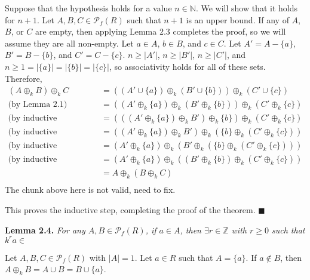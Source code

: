 \documentclass{article}
\newcommand{\abs}[1]{\left|#1\right|}
\newcommand{\zee}{\mathbb{Z}}
\newcommand{\N}{\mathbb{N}}
\begin{document}
Suppose that the hypothesis holds for a value $n \in \N$.
We will show that it holds for $n + 1$.
Let $A, B, C \in \mathcal{P}_f(R)$ such that $n + 1$
is an upper bound.
If any of $A$, $B$, or $C$ are empty, then applying
Lemma 2.3 completes the proof, so we will assume they are
all non-empty. Let $a \in A$, $b \in B$, and $c \in C$.
Let $A' = A - \{a\}$, $B' = B - \{b\}$, and $C' = C - \{c\}$.
$n \geq \abs{A'}$, $n \geq \abs{B'}$, $n \geq \abs{C'}$,
and $n \geq 1 = \abs{\{a\}} = \abs{\{b\}} = \abs{\{c\}}$,
so associativity holds for all of these sets. Therefore,
\[\begin{split}
    (A \oplus_k B) \oplus_k C
    &= ((A' \cup \{a\}) \oplus_k (B' \cup \{b\}))
        \oplus_k (C' \cup \{c\}) \\
    \text{(by Lemma 2.1)}\quad
    &= ((A' \oplus_k \{a\}) \oplus_k (B' \oplus_k \{b\}))
        \oplus_k (C' \oplus_k \{c\}) \\
    \text{(by inductive hypothesis)}\quad
    &= (((A' \oplus_k \{a\}) \oplus_k B') \oplus_k \{b\})
        \oplus_k (C' \oplus_k \{c\}) \\
    \text{(by inductive hypothesis)}\quad
    &= ((A' \oplus_k \{a\}) \oplus_k B') \oplus_k
        (\{b\} \oplus_k (C' \oplus_k \{c\})) \\
    \text{(by inductive hypothesis)}\quad
    &= (A' \oplus_k \{a\}) \oplus_k (B' \oplus_k
        (\{b\} \oplus_k (C' \oplus_k \{c\}))) \\
    \text{(by inductive hypothesis)}\quad
    &= (A' \oplus_k \{a\}) \oplus_k ((B' \oplus_k
        \{b\}) \oplus_k (C' \oplus_k \{c\})) \\
    &= A \oplus_k (B \oplus_k C) \\
\end{split}\]
The chunk above here is not valid, need to fix.

This proves the inductive step, completing the proof of
the theorem.
$\blacksquare$

\textbf{Lemma 2.4.} \textit{
    For any $A, B \in \mathcal{P}_f(R)$,
    if $a \in A$, then $\exists r \in \zee$
    with $r \geq 0$ such that $k^ra \in $
}

Let $A, B, C \in \mathcal{P}_f(R)$ with $\abs{A} = 1$.
Let $a \in R$ such that $A = \{a\}$. If $a \not\in B$,
then $A \oplus_k B = A \cup B = B \cup \{a\}$.
\end{document}
